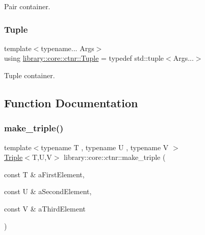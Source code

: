 Pair container. 

\mbox{\label{namespacelibrary_1_1core_1_1ctnr_a551ef72e2adb570c4d6bdf5e1bbc96b9}} 
\subsubsection{\texorpdfstring{Tuple}{Tuple}}
{\footnotesize\ttfamily template$<$typename... Args$>$ \\
using \hyperlink{namespacelibrary_1_1core_1_1ctnr_a551ef72e2adb570c4d6bdf5e1bbc96b9}{library\+::core\+::ctnr\+::\+Tuple} = typedef std\+::tuple$<$Args...$>$}



Tuple container. 



\subsection{Function Documentation}
\mbox{\label{namespacelibrary_1_1core_1_1ctnr_a96a0b941c0de59772cb5e073d0c2b8a8}} 
\subsubsection{\texorpdfstring{make\+\_\+triple()}{make\_triple()}}
{\footnotesize\ttfamily template$<$typename T , typename U , typename V $>$ \\
\hyperlink{structlibrary_1_1core_1_1ctnr_1_1Triple}{Triple}$<$T,U,V$>$ library\+::core\+::ctnr\+::make\+\_\+triple (\begin{DoxyParamCaption}\item[{const T \&}]{a\+First\+Element,  }\item[{const U \&}]{a\+Second\+Element,  }\item[{const V \&}]{a\+Third\+Element }\end{DoxyParamCaption})}

